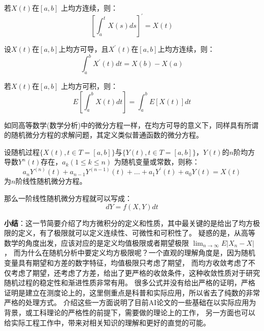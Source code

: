 \begin{theorem}
  若$X(t)$在$[a, b]$ 上均方连续，则：
  \begin{equation}
    \left[\int_a^t X(s) d s\right]^{\prime}=X(t)
  \end{equation}
\end{theorem}

\begin{theorem}[牛顿-莱布尼茨公式]
  设$X(t)$在$[a, b]$上均方可导，且$X^{\prime}(t)$在$[a, b]$上均方连续，则：
  \begin{equation}
    \int_a^b X^{\prime}(t) d t=X(b)-X(a)
  \end{equation}
\end{theorem}

\begin{theorem}
  若$X(t)$在$[a, b]$ 上均方可积，则：
  \begin{equation}
    E\left[\int_a^b X(t) d t\right]=\int_a^b E[X(t)] d t
  \end{equation}
\end{theorem}

如同高等数学(数学分析)中的微分方程一样，在均方可导的意义下，同样具有所谓的随机微分方程的求解问题，其定义类似普通函数的微分方程。

\begin{definition}
  设随机过程$\{X(t), t \in T =[a, b] \}$与$\{Y(t), t \in T =[a, b] \}$，$Y(t)$的$n$阶均方导数$Y^{n}(t)$存在，$a_k(1 \leq k \leq n)$
  为随机变量或常数，则称：
  \begin{equation}
    a_n Y^{(n)}(t)+a_{n-1}Y^{(n-1)}(t)+\ldots+a_1 Y^{\prime}(t)+a_0 Y(t)=X(t)
  \end{equation}
  为$n$阶线性随机微分方程。
\end{definition}
那么一阶线性随机微分方程就可以写成：
\begin{equation}
  dY = f(X, Y) dt
\end{equation}

\textbf{小结}：这一节简要介绍了均方微积分的定义和性质，其中最关键的是给出了均方极限的定义，有了极限就可以定义连续性、可微性和可积性了。
疑惑的是，从高等数学的角度出发，应该对应的是定义均值极限或者期望极限 $\lim_{n\rightarrow \infty}E|X_n - X|$，
而为什么在随机分析中要定义均方极限呢？一个直观的理解角度是，因为随机变量具有期望和方差的数字特征，均值极限只考虑了期望，
而均方收敛考虑了不仅考虑了期望，还考虑了方差，给出了更严格的收敛条件，这种收敛性质对于研究随机过程的稳定性和渐进性质非常有用。
很多公式并没有给出严格的证明，严格证明是建立在测度论上的，这里侧重点是科普和实际应用，所以省去了纯数的非常严格的处理方式。
介绍这些一方面说明了目前AI论文的一些基础在以实际应用为背景，或工科理论的严格性的前提下，需要做的理论上的工作，
另一方面也可以给实际工程工作中，带来对相关知识的理解和更好的直觉的可能。

